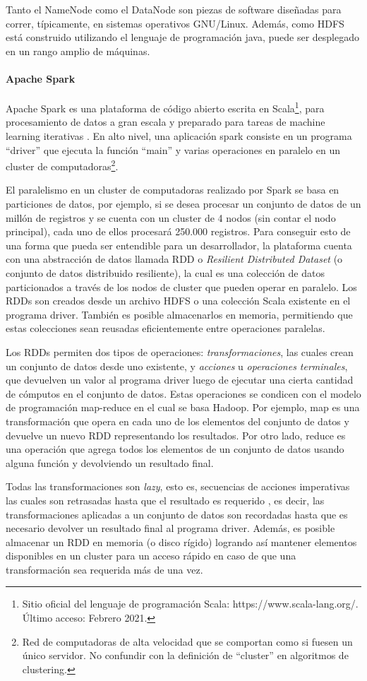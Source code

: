 \bigskip Tanto el NameNode como el DataNode son piezas de software diseñadas para correr, típicamente, en sistemas operativos GNU/Linux. Además, como HDFS está construido utilizando el lenguaje de programación java, puede ser desplegado en un rango amplio de máquinas.

\paragraph{Apache Spark}
Apache Spark es una plataforma de código abierto escrita en Scala\footnote{Sitio oficial del lenguaje de programación Scala: https://www.scala-lang.org/. Último acceso: Febrero 2021.}, para procesamiento de datos a gran escala y preparado para tareas de machine learning iterativas \citep{meng2016mllib}. En alto nivel, una aplicación spark consiste en un programa “driver” que ejecuta la función “main” y varias operaciones en paralelo en un cluster de computadoras\footnote{Red de computadoras de alta velocidad que se comportan como si fuesen un único servidor. No confundir con la definición de “cluster” en algoritmos de clustering.}.

\bigskip El paralelismo en un cluster de computadoras realizado por Spark se basa en particiones de datos, por ejemplo, si se desea procesar un conjunto de datos de un millón de registros y se cuenta con un cluster de 4 nodos (sin contar el nodo principal), cada uno de ellos procesará 250.000 registros. Para conseguir esto de una forma que pueda ser entendible para un desarrollador, la plataforma cuenta con una abstracción de datos llamada RDD o \textit{Resilient Distributed Dataset} (o conjunto de datos distribuido resiliente), la cual es una colección de datos particionados a través de los nodos de cluster que pueden operar en paralelo. Los RDDs son creados desde un archivo HDFS o una colección Scala existente en el programa driver. También es posible almacenarlos en memoria, permitiendo que estas colecciones sean reusadas eficientemente entre operaciones paralelas.

\bigskip Los RDDs permiten dos tipos de operaciones: \textit{transformaciones}, las cuales crean un conjunto de datos desde uno existente, y \textit{acciones} u \textit{operaciones terminales}, que devuelven un valor al programa driver luego de ejecutar una cierta cantidad de cómputos en el conjunto de datos. Estas operaciones se condicen con el modelo de programación map-reduce en el cual se basa Hadoop. Por ejemplo, map es una transformación que opera en cada uno de los elementos del conjunto de datos y devuelve un nuevo RDD representando los resultados. Por otro lado, reduce es una operación que agrega todos los elementos de un conjunto de datos usando alguna función y devolviendo un resultado final.

\bigskip Todas las transformaciones son \textit{lazy}, esto es, secuencias de acciones imperativas las cuales son retrasadas hasta que el resultado es requerido \citep{launchbury1993lazy}, es decir, las transformaciones aplicadas a un conjunto de datos son recordadas hasta que es necesario devolver un resultado final al programa driver. Además, es posible almacenar un RDD en memoria (o disco rígido) logrando así mantener elementos disponibles en un cluster para un acceso rápido en caso de que una transformación sea requerida más de una vez.